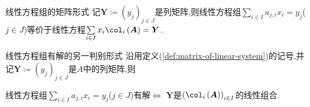 \begin{remark}{线性方程组的矩阵形式}{}
	记$\boldsymbol{Y}\coloneq\left(y_{j}\right)_{j\in J}$是列矩阵,则线性方程组$\sum\limits_{i\in I}a_{j,i}x_{i}=y_{j}$($j\in J$)等价于线性方程$\sum\limits_{i\in I}x_{i}\col_{i}\left(\boldsymbol{A}\right)=\boldsymbol{Y}$.
\end{remark}

\begin{theorem}{线性方程组有解的另一判别形式}{}
	沿用定义(\cref{def:matrix-of-linear-system})的记号,并记$\boldsymbol{Y}\coloneq\left(y_{j}\right)_{j\in J}$是$A$中的列矩阵,则
	\begin{center}
		线性方程组$\sum\limits_{i\in I}a_{j,i}x_{i}=y_{j}$($j\in J$)有解$\iff$ $\boldsymbol{Y}$是$\left(\col_{i}\left(\boldsymbol{A}\right)\right)_{i\in I}$的线性组合.
	\end{center}
\end{theorem}